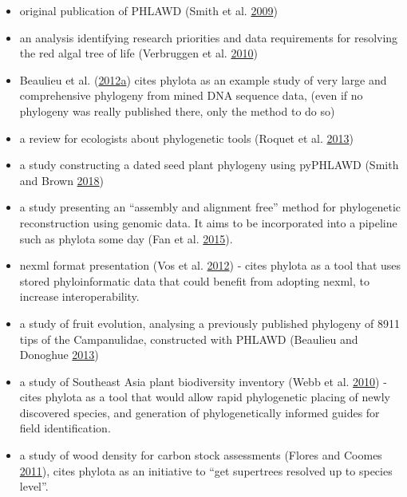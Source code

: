 \documentclass[]{article}
\providecommand{\tightlist}{%
  \setlength{\itemsep}{0pt}\setlength{\parskip}{0pt}}
\begin{document}
\begin{enumerate}
  \begin{itemize}
  \tightlist
  \item
    original publication of PHLAWD (Smith et al. \protect\hyperlink{ref-smith2009mega}{2009})
  \item
    an analysis identifying research priorities and data requirements for resolving
    the red algal tree of life (Verbruggen et al. \protect\hyperlink{ref-verbruggen2010data}{2010})
  \item
    Beaulieu et al. (\protect\hyperlink{ref-beaulieu2012modeling}{2012}\protect\hyperlink{ref-beaulieu2012modeling}{a}) cites phylota as an example study of very large and comprehensive
    phylogeny from mined DNA sequence data, (even if no phylogeny was really published
    there, only the method to do so)
  \item
    a review for ecologists about phylogenetic tools (Roquet et al. \protect\hyperlink{ref-roquet2013building}{2013})
  \item
    a study constructing a dated seed plant phylogeny using pyPHLAWD (Smith and Brown \protect\hyperlink{ref-smith2018constructing}{2018})
  \item
    a study presenting an ``assembly and alignment free'' method for phylogenetic reconstruction
    using genomic data. It aims to be incorporated into a pipeline such as phylota some day (Fan et al. \protect\hyperlink{ref-fan2015assembly}{2015}).
  \item
    nexml format presentation (Vos et al. \protect\hyperlink{ref-vos2012nexml}{2012}) - cites phylota as a tool that uses
    stored phyloinformatic data that could benefit from adopting nexml, to increase
    interoperability.
  \item
    a study of fruit evolution, analysing a previously published phylogeny of 8911
    tips of the Campanulidae, constructed with PHLAWD (Beaulieu and Donoghue \protect\hyperlink{ref-beaulieu2013fruit}{2013})
  \item
    a study of Southeast Asia plant biodiversity inventory (Webb et al. \protect\hyperlink{ref-webb2010biodiversity}{2010}) -
    cites phylota as a tool that would allow rapid phylogenetic placing of newly
    discovered species, and generation of phylogenetically informed guides for field
    identification.
  \item
    a study of wood density for carbon stock assessments (Flores and Coomes \protect\hyperlink{ref-flores2011estimating}{2011}),
    cites phylota as an initiative to ``get supertrees resolved up to species level''.

\end{itemize}
\end{enumerate}
\end{document}
